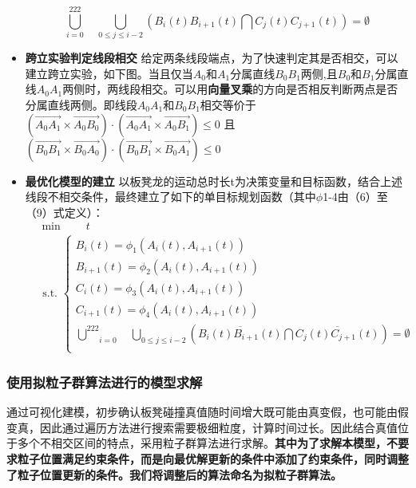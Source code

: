 \documentclass[a4paper]{article}
\begin{document}
\begin{itemize}
          $$ \underset{i=0}{\overset{222}{\bigcup}}\quad \underset{0\leq j \leq i - 2}{\bigcup}(B_i(t)B_{i + 1}(t) \bigcap C_j(t)C_{j + 1}(t)) = \emptyset$$
        \item {\textbf{跨立实验判定线段相交}}
        给定两条线段端点，为了快速判定其是否相交，可以建立跨立实验，如下图。当且仅当$A_0和A_1$分属直线$B_0B_1$两侧,且$B_0和B_1$分属直线$A_0A_1$两侧时，两线段相交。可以用\textbf{向量叉乘}的方向是否相反判断两点是否分属直线两侧。即线段$A_0A_1$和$B_0B_1$相交等价于$(\overrightarrow{A_0A_1} \times \overrightarrow{A_0B_0}) \cdot (\overrightarrow{A_0A_1} \times \overrightarrow{A_0B_1}) \leq 0$ 且 $(\overrightarrow{B_0B_1} \times \overrightarrow{B_0A_0}) \cdot (\overrightarrow{B_0B_1} \times \overrightarrow{B_0A_1}) \leq 0$
        \item {\textbf{最优化模型的建立}}
		以板凳龙的运动总时长t为决策变量和目标函数，结合上述线段不相交条件，最终建立了如下的单目标规划函数（其中$\phi$1-4由（6）至（9）式定义）：
		\begin{equation}
			\begin{aligned}
				& \min \quad \quad t \\
				& \text { s.t. }\left\{\begin{array}{l}
                        B_i(t) = \phi_1(A_i(t), A_{i + 1}(t))\\
                        B_{i + 1}(t) = \phi_2(A_i(t), A_{i + 1}(t))\\
                        C_i(t) = \phi_3(A_i(t), A_{i + 1}(t))\\
                        C_{i + 1}(t) = \phi_4(A_i(t), A_{i + 1}(t))\\
               \underset{i=0}{\overset{222}{\bigcup}}\quad \underset{0\leq j \leq i - 2}{\bigcup}(\overline{B_i(t)B_{i + 1}(t)} \bigcap \overline{C_j(t)C_{j + 1}(t)}) = \emptyset

  \\

				\end{array}\right.
			\end{aligned}
		\end{equation}
    \end{itemize}
	\subsubsection{使用拟粒子群算法进行的模型求解}
 通过可视化建模，初步确认板凳碰撞真值随时间增大既可能由真变假，也可能由假变真，因此通过遍历方法进行搜索需要极细粒度，计算时间过长。因此结合真值位于多个不相交区间的特点，采用粒子群算法进行求解。\textbf{其中为了求解本模型，不要求粒子位置满足约束条件，而是向最优解更新的条件中添加了约束条件，同时调整了粒子位置更新的条件。我们将调整后的算法命名为拟粒子群算法。}
\end{document}
